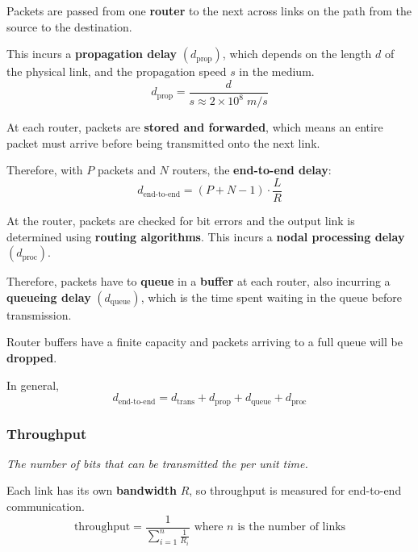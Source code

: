 Packets are passed from one \textbf{router} to the next across links on the path from the source to the destination.

This incurs a \textbf{propagation delay} $\left(d_{\text{prop}}\right)$, which depends on the length $d$ of the physical link,
and the propagation speed $s$ in the medium.\\
\begin{equation*}
    d_{\text{prop}} = \frac{d}{s \approx 2 \times 10^8 \; m/s}
\end{equation*}

At each router, packets are \textbf{stored and forwarded}, which means an entire packet must arrive before being
transmitted onto the next link.

Therefore, with $P$ packets and $N$ routers, the \textbf{end-to-end delay}:\\
\begin{equation*}
    d_{\text{end-to-end}} = (P + N - 1) \cdot \frac{L}{R}
\end{equation*}

At the router, packets are checked for bit errors and the output link is determined using \textbf{routing algorithms}.
This incurs a \textbf{nodal processing delay} $\left(d_{\text{proc}}\right)$.

Therefore, packets have to \textbf{queue} in a \textbf{buffer} at each router,
also incurring a \textbf{queueing delay} $\left(d_{\text{queue}}\right)$, which is the time spent waiting in the
queue before transmission.

Router buffers have a finite capacity and packets arriving to a full queue will be \textbf{dropped}.

In general,\\
\begin{equation*}
    d_{\text{end-to-end}} = d_{\text{trans}} + d_{\text{prop}} + d_{\text{queue}} + d_{\text{proc}} 
\end{equation*}

\subsubsection{Throughput}
\emph{The number of bits that can be transmitted the per unit time.}

Each link has its own \textbf{bandwidth} $R$, so throughput is measured for end-to-end communication.\\
\begin{equation*}
    \text{throughput} = \frac{1}{\sum_{i=1}^{n} \frac{1}{R_{i}}} \text{ where $n$ is the number of links}
\end{equation*}

